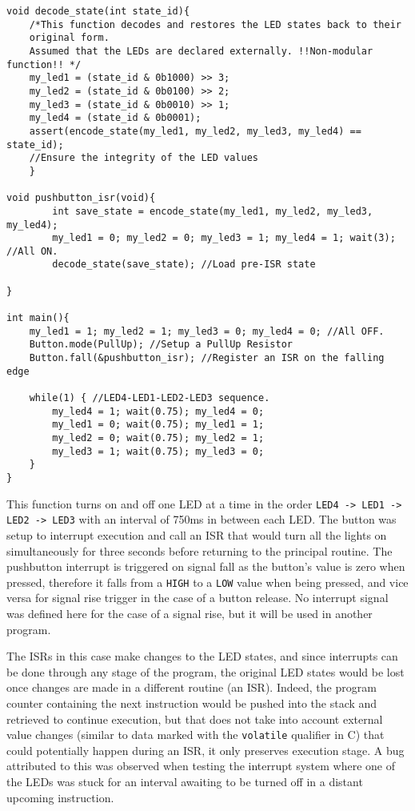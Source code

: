 \documentclass{article}
\begin{document}
\begin{verbatim}
void decode_state(int state_id){
    /*This function decodes and restores the LED states back to their
    original form.
    Assumed that the LEDs are declared externally. !!Non-modular function!! */
    my_led1 = (state_id & 0b1000) >> 3;
    my_led2 = (state_id & 0b0100) >> 2;
    my_led3 = (state_id & 0b0010) >> 1;
    my_led4 = (state_id & 0b0001);
    assert(encode_state(my_led1, my_led2, my_led3, my_led4) == state_id);
    //Ensure the integrity of the LED values
    }

void pushbutton_isr(void){
        int save_state = encode_state(my_led1, my_led2, my_led3, my_led4);
        my_led1 = 0; my_led2 = 0; my_led3 = 1; my_led4 = 1; wait(3); //All ON.
        decode_state(save_state); //Load pre-ISR state
        
}

int main(){
    my_led1 = 1; my_led2 = 1; my_led3 = 0; my_led4 = 0; //All OFF.
    Button.mode(PullUp); //Setup a PullUp Resistor
    Button.fall(&pushbutton_isr); //Register an ISR on the falling edge
    
    while(1) { //LED4-LED1-LED2-LED3 sequence.
        my_led4 = 1; wait(0.75); my_led4 = 0;
        my_led1 = 0; wait(0.75); my_led1 = 1;
        my_led2 = 0; wait(0.75); my_led2 = 1;
        my_led3 = 1; wait(0.75); my_led3 = 0;     
    }
}
\end{verbatim}
\pagebreak

This function turns on and off one LED at a time in the order \texttt{LED4 -> LED1 -> LED2 -> LED3} with an interval of 750ms in between each LED. The button was setup to interrupt execution and call an ISR that would turn all the lights on simultaneously for three seconds before returning to the principal routine. The pushbutton interrupt is triggered on signal fall as the button's value is zero when pressed, therefore it falls from a \texttt{HIGH} to a \texttt{LOW} value when being pressed, and vice versa for signal rise trigger in the case of a button release. No interrupt signal was defined here for the case of a signal rise, but it will be used in another program.

The ISRs in this case make changes to the LED states, and since interrupts can be done through any stage of the program, the original LED states would be lost once changes are made in a different routine (an ISR). Indeed, the program counter containing the next instruction would be pushed into the stack and retrieved to continue execution, but that does not take into account external value changes (similar to data marked with the \texttt{volatile} qualifier in C) that could potentially happen during an ISR, it only preserves execution stage. A bug attributed to this was observed when testing the interrupt system where one of the LEDs was stuck for an interval awaiting to be turned off in a distant upcoming instruction.
\end{document}
